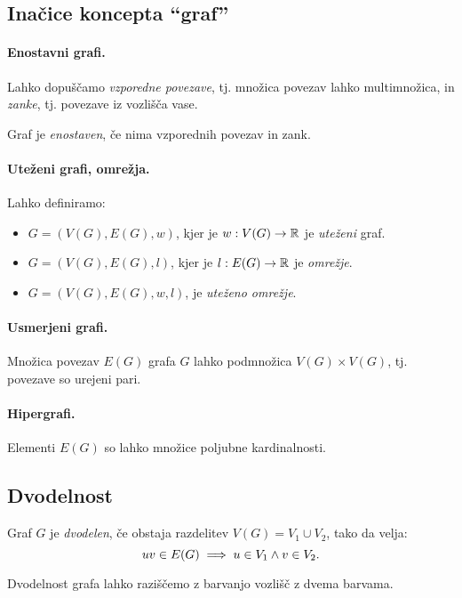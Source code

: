 \subsection{Inačice koncepta "`graf"'}
\paragraph{Enostavni grafi.} Lahko dopuščamo \emph{vzporedne povezave}, tj. množica povezav lahko multimnožica, in \emph{zanke}, tj. povezave iz vozlišča vase.
\begin{definicija}
    Graf je \emph{enostaven}, če nima vzporednih povezav in zank.
\end{definicija}

\paragraph{Uteženi grafi, omrežja.} Lahko definiramo:
\begin{itemize}
    \item $G = (V(G), E(G), w)$, kjer je $w: V(G) \to \mathbb{R}$ je \emph{uteženi} graf.
    \item $G = (V(G), E(G), l)$, kjer je $l: E(G) \to \mathbb{R}$ je \emph{omrežje}.
    \item $G = (V(G), E(G), w, l)$, je \emph{uteženo omrežje}. 
\end{itemize}

\paragraph{Usmerjeni grafi.} Množica povezav $E(G)$ grafa $G$ lahko podmnožica $V(G) \times V(G)$, tj. povezave so urejeni pari.

\paragraph{Hipergrafi.} Elementi $E(G)$ so lahko množice poljubne kardinalnosti.

\subsection{Dvodelnost}
\begin{definicija}
    Graf $G$ je \emph{dvodelen}, če obstaja razdelitev $V(G) = V_1 \cup V_2$, tako da velja: $$uv \in E(G) \implies u \in V_1 \land v \in V_2.$$
\end{definicija}

\begin{opomba}
    Dvodelnost grafa lahko raziščemo z barvanjo vozlišč z dvema barvama.
\end{opomba}


